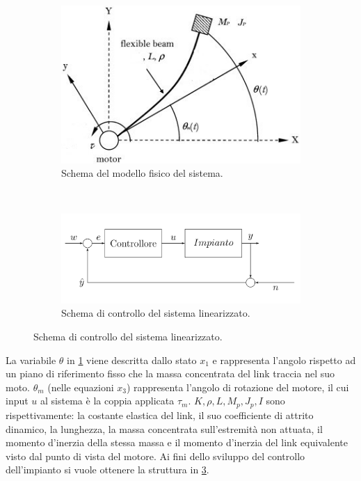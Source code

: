 \documentclass[a4paper]{article}
\begin{document}
\begin{figure}[h!]
    \centering
 \begin{subfigure}{0.45\textwidth}
    \centering
    \includegraphics[width=\textwidth]{schematic.png}
    \caption{Schema del modello fisico del sistema.}
    \label{fig:sys_schem}
 \end{subfigure}
 ~
 \begin{subfigure}{0.45\textwidth}
    \centering
    \includegraphics[width=\textwidth]{control_sys.png}
    \caption{Schema di controllo del sistema linearizzato.}
    \label{fig:sys_cont}
 \end{subfigure}
\end{figure}
La variabile $\theta$ in \cref{fig:sys_schem} viene descritta dallo stato $x_1$ e rappresenta l’angolo rispetto ad un piano di riferimento fisso che la massa concentrata del link traccia nel suo moto. $\theta_m$ (nelle equazioni $x_3$) rappresenta l’angolo di rotazione del motore, il cui input $u$ al sistema è la coppia applicata $\tau_m$. $K, \rho, L, M_p, J_p, I$ sono rispettivamente: la costante elastica del link, il suo coefficiente di attrito dinamico, la lunghezza, la massa concentrata sull’estremità non attuata, il momento d’inerzia della stessa massa e il momento d’inerzia del link equivalente visto dal punto di vista del motore.
Ai fini dello sviluppo del controllo dell’impianto si vuole ottenere la struttura in \cref{fig:sys_cont}.
\end{document}
